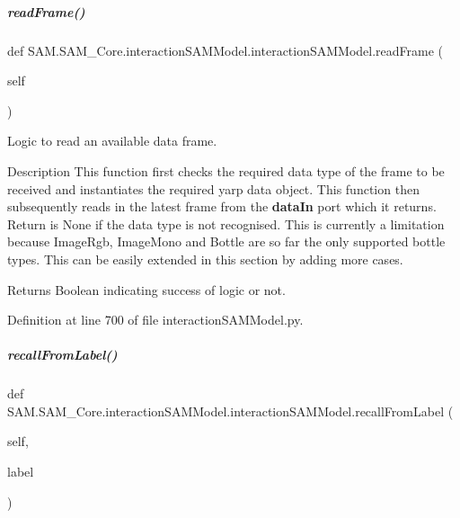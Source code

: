 \mbox{\label{group__icubclient__SAM__Core_ac61db7ca04e5e86639c0413b14421c64}} 
\subparagraph{\texorpdfstring{read\+Frame()}{readFrame()}}
{\footnotesize\ttfamily def S\+A\+M.\+S\+A\+M\+\_\+\+Core.\+interaction\+S\+A\+M\+Model.\+interaction\+S\+A\+M\+Model.\+read\+Frame (\begin{DoxyParamCaption}\item[{}]{self }\end{DoxyParamCaption})}



Logic to read an available data frame. 

\begin{DoxyParagraph}{Description}
This function first checks the required data type of the frame to be received and instantiates the required yarp data object. This function then subsequently reads in the latest frame from the {\bfseries data\+In} port which it returns. Return is {\ttfamily None} if the data type is not recognised. This is currently a limitation because {\ttfamily Image\+Rgb}, {\ttfamily Image\+Mono} and {\ttfamily Bottle} are so far the only supported bottle types. This can be easily extended in this section by adding more cases.
\end{DoxyParagraph}
Returns Boolean indicating success of logic or not. 

Definition at line 700 of file interaction\+S\+A\+M\+Model.\+py.

\mbox{\label{group__icubclient__SAM__Core_a520238102076c1921ed1ca4a27942035}} 
\subparagraph{\texorpdfstring{recall\+From\+Label()}{recallFromLabel()}}
{\footnotesize\ttfamily def S\+A\+M.\+S\+A\+M\+\_\+\+Core.\+interaction\+S\+A\+M\+Model.\+interaction\+S\+A\+M\+Model.\+recall\+From\+Label (\begin{DoxyParamCaption}\item[{}]{self,  }\item[{}]{label }\end{DoxyParamCaption})}



